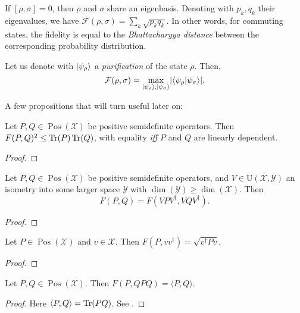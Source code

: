 \documentclass[12pt]{report}
\newcommand{\calF}{{\mathcal{F}}}
\newcommand{\calY}{{\mathcal{Y}}}
\newcommand{\calX}{{\mathcal{X}}}
\newcommand{\rmU}{{\mathrm{U}}}
\DeclareMathOperator{\Pos}{Pos}
\begin{document}
\begin{prop}
	If $[\rho,\sigma]=0$, then $\rho$ and $\sigma$ share an eigenbasis. Denoting with $p_k, q_k$ their eigenvalues, we have $\calF(\rho,\sigma)=\sum_k\sqrt{p_k q_k}$.
	In other words, for commuting states, the fidelity is equal to the \emph{Bhattacharyya distance} between the corresponding probability distribution.
\end{prop}

\begin{thm}
	Let us denote with $\ket{\psi_\rho}$ a \emph{purification} of the state $\rho$. Then,
	\begin{equation}
		\calF(\rho,\sigma)=\max_{\ket{\psi_\rho},\ket{\psi_\sigma}}\lvert\braket{\psi_\rho}{\psi_\sigma}\rvert.
	\end{equation}
\end{thm}

A few propositions that will turn useful later on:
\begin{prop}
	Let $P,Q\in\Pos(\calX)$ be positive semidefinite operators.
	Then $F(P,Q)^2 \le \Tr(P)\Tr(Q)$, with equality \emph{iff} $P$ and $Q$ are linearly dependent.
\end{prop}
\begin{proof}
\end{proof}

\begin{prop}
	Let $P,Q\in\Pos(\calX)$ be positive semidefinite operators, and $V\in\rmU(\calX,\calY)$ an isometry into some larger space $\calY$ with $\dim(\calY)\ge\dim(\calX)$. Then
	\begin{equation}
		F(P,Q) = F(VPV^\dagger, VQV^\dagger).
	\end{equation}
\end{prop}
\begin{proof}
\end{proof}

\begin{prop}
	Let $P\in\Pos(\calX)$ and $v\in\calX$. Then
	$F(P,vv^\dagger) = \sqrt{v^\dagger  P v}$.
\end{prop}
\begin{proof}
\end{proof}

\begin{prop}
	Let $P,Q\in\Pos(\calX)$. Then
	$F(P,QPQ) = \langle P,Q\rangle$.
\end{prop}
\begin{proof}
	Here $\langle P,Q\rangle=\Tr(PQ)$. See .
\end{proof}
\end{document}
